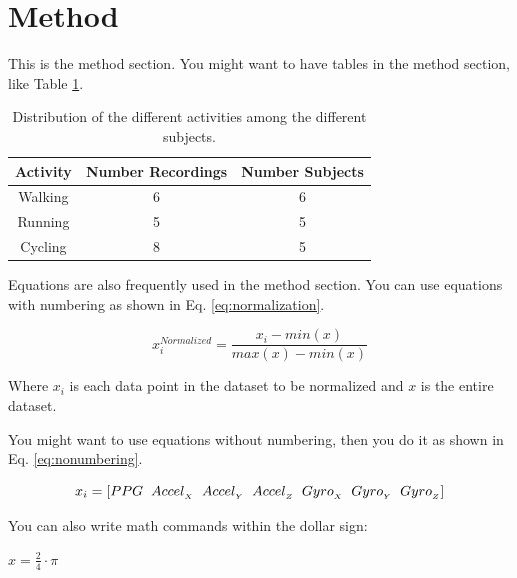 \documentclass[../main.tex]{subfiles}
\begin{document}
\section{Method}
\justify
This is the method section. You might want to have tables in the method section, like Table \ref{tab:activityDistribution}.\par\vspace{5mm}

\begin{table}[H]
    \small
    \centering
    \caption{Distribution of the different activities among the different subjects.}
    \label{tab:activityDistribution}
    \begin{tabular}{c c c}
        \hline\hline
        \rowcolor{lightgray}\hspace{6mm}\textbf{Activity}\hspace{6mm} & \hspace{6mm}\textbf{Number Recordings}\hspace{6mm} & \hspace{6mm}\textbf{Number Subjects}\hspace{6mm} \\\hline
        Walking & 6 & 6 \\
        \rowcolor{lightlightgray} Running & 5 & 5\\
        Cycling & 8 & 5\\
       \hline
    \end{tabular}
\end{table}

\noindent
Equations are also frequently used in the method section. You can use equations with numbering as shown in Eq. \ref{eq:normalization}.

\begin{equation}\label{eq:normalization}
    x^{Normalized}_{i} = \frac{x_i-min(x)}{max(x)-min(x)}
\end{equation}

\noindent
Where $x_i$ is each data point in the dataset to be normalized and $x$ is the entire dataset.\par\vspace{5mm}

\noindent
You might want to use equations without numbering, then you do it as shown in Eq. \ref{eq:nonumbering}.

\begin{equation*}\label{eq:nonumbering}
    x_{i} = [PPG\hspace{2mm}Accel_{_{X}}\hspace{2mm}Accel_{_{Y}}\hspace{2mm}Accel_{_{Z}}\hspace{2mm}Gyro_{_{X}}\hspace{2mm}Gyro_{_{Y}}\hspace{2mm}Gyro_{_{Z}}]   
\end{equation*}

\noindent
You can also write math commands within the dollar sign:

\noindent
$x = \frac{2}{4} \cdot \pi$\par
\end{document}
